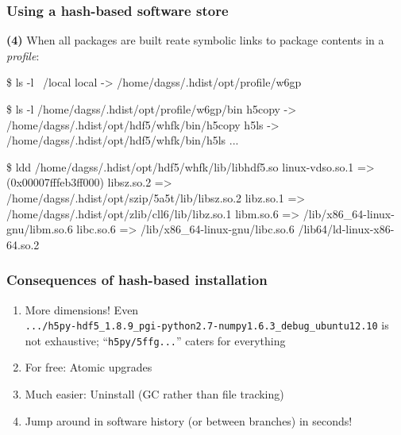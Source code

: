 \documentclass[sans,mathserif]{beamer}
\begin{document}
\begin{frame}[fragile]
  \frametitle{Using a hash-based software store}
{\bf (4)} When all packages are built reate symbolic links to
  package contents in a {\em profile}:
{
\footnotesize

\begin{semiverbatim}
\$ ls -l ~/local
local -> /home/dagss/.hdist/opt/profile/w6gp

\$ ls -l /home/dagss/.hdist/opt/profile/w6gp/bin
h5copy -> /home/dagss/.hdist/opt/hdf5/whfk/bin/h5copy
h5ls -> /home/dagss/.hdist/opt/hdf5/whfk/bin/h5ls
...

\$ ldd /home/dagss/.hdist/opt/hdf5/whfk/lib/libhdf5.so
linux-vdso.so.1 => (0x00007fffeb3ff000)
libsz.so.2 => {\color{red}/home/dagss/.hdist/opt/szip/5a5t/lib/libsz.so.2}
libz.so.1 => {\color{red}/home/dagss/.hdist/opt/zlib/cll6/lib/libz.so.1}
libm.so.6 => /lib/x86\_64-linux-gnu/libm.so.6
libc.so.6 => /lib/x86\_64-linux-gnu/libc.so.6
/lib64/ld-linux-x86-64.so.2
\end{semiverbatim}
}
  
\end{frame}




\begin{frame}
  \frametitle{Consequences of hash-based installation}
  \begin{enumerate}
  \item<+-> More dimensions! Even \\
{\footnotesize
{\tt .../h5py-hdf5\_1.8.9\_pgi-python2.7-numpy1.6.3\_debug\_ubuntu12.10}
}
is not exhaustive; ``{\tt h5py/5ffg...}'' caters for everything

  \item<+-> For free: Atomic upgrades
  \item<+-> Much easier: Uninstall (GC rather than file tracking)
  \item<+-> Jump around in software history (or between branches) in seconds!
  \end{enumerate}

~

\end{frame}
\end{document}
